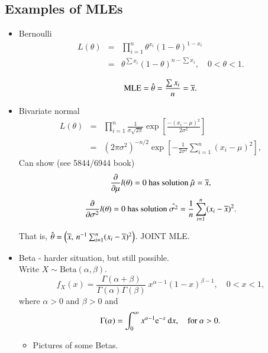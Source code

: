 \documentclass[captions=tableheading]{scrbook}
\begin{document}
\subsection{Examples of MLEs}
\label{sec-1_1_3}
\begin{itemize}

\item Bernoulli
\label{sec-1_1_3_1}%
\begin{eqnarray*}
L(\theta) & = & \prod_{i=1}^{n}\theta^{x_{i}}(1-\theta)^{1-x_{i}}\\
 & = & \theta^{\sum x_{i}}(1-\theta)^{n-\sum x_{i}},\quad0<\theta<1.
\end{eqnarray*}

\[
\mathrm{MLE} = \hat{\theta} = \frac{\sum x_{i}}{n} = \overline{x}. 
\]


\item Bivariate normal
\label{sec-1_1_3_2}%
\begin{eqnarray*}
L(\theta) & = & \prod_{i=1}^{n}\frac{1}{\sigma\sqrt{2\pi}}\exp\left[\frac{-(x_{i}-\mu)^{2}}{2\sigma^{2}}\right]\\
 & = & (2\pi\sigma^{2})^{-n/2}\exp\left[-\frac{1}{2\sigma^{2}}\sum_{i=1}^{n}(x_{i}-\mu)^{2}\right],
\end{eqnarray*}
Can show (see 5844/6944 book)
\[
\frac{\partial}{\partial\mu}l(\theta) = 0 \mbox{ has solution } \hat{\mu}=\overline{x},
\]
\[
\frac{\partial}{\partial\sigma^{2}}l(\theta) = 0 \mbox{ has solution } \hat{\sigma^{2}}=\frac{1}{n}\sum_{i=1}^{n}(x_{i} - \overline{x})^{2}.
\]

That is, $\hat{\theta} = \left(\overline{x},\,n^{-1}\sum_{i=1}^{n}(x_{i} - \overline{x})^{2}\right)$.  JOINT MLE.


\item Beta - harder situation, but still possible.\\
\label{sec-1_1_3_3}%
Write $X \sim \mathrm{Beta}(\alpha,\beta)$.
\begin{equation}
f_{X}(x)=\frac{\Gamma(\alpha+\beta)}{\Gamma(\alpha)\Gamma(\beta)}\: x^{\alpha-1}(1-x)^{\beta-1},\quad0 < x <1,
\end{equation}
where $\alpha > 0$ and $\beta > 0$ and
\[
\begin{equation}
\Gamma(\alpha)=\int_{0}^{\infty}x^{\alpha-1}\me^{-x}\:\diff x,\quad\mbox{for }\alpha>0.
\end{equation}
\]


\begin{itemize}
\item Pictures of some Betas.
\end{itemize}


\end{itemize}
\end{document}
